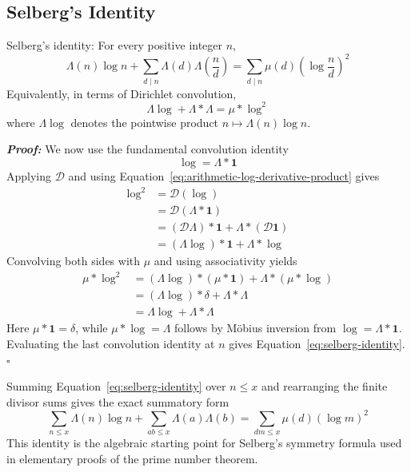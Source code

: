 \documentclass[a4paper,11pt,abstracton]{scrartcl}
\theoremstyle{dotlessP}
\theoremstyle{dotlessS}
\theoremstyle{remark}
\theoremstyle{definition}
\begin{document}
\subsection{Selberg's Identity}
\label{subsec:selberg-identity}

\begin{mainbox}{Selberg's identity:}
For every positive integer $n$,
\begin{equation}
\label{eq:selberg-identity}
    \Lambda(n)\log n
      +\sum_{d\mid n}\Lambda(d)\Lambda\!\left(\frac nd\right)
      =\sum_{d\mid n}\mu(d)
        \left(\log\frac nd\right)^2
\end{equation}
Equivalently, in terms of Dirichlet convolution,
\[
    \Lambda\log+\Lambda*\Lambda=\mu*\log^2
\]
where $\Lambda\log$ denotes the pointwise product
$n\mapsto\Lambda(n)\log n$.
\end{mainbox}

\begin{claim_box}
\textbf{\textit{Proof:}}
We now use the fundamental convolution identity
\[
    \log=\Lambda*\mathbf{1}
\]
Applying $\mathcal{D}$ and using
Equation~\eqref{eq:arithmetic-log-derivative-product} gives
\begin{align*}
    \log^2
      &=\mathcal{D}(\log)\\
      &=\mathcal{D}(\Lambda*\mathbf{1})\\
      &=(\mathcal{D}\Lambda)*\mathbf{1}
        +\Lambda*(\mathcal{D}\mathbf{1})\\
      &=(\Lambda\log)*\mathbf{1}+\Lambda*\log
\end{align*}
Convolving both sides with $\mu$ and using associativity yields
\begin{align*}
    \mu*\log^2
      &=(\Lambda\log)*(\mu*\mathbf{1})
        +\Lambda*(\mu*\log)\\
      &=(\Lambda\log)*\delta+\Lambda*\Lambda\\
      &=\Lambda\log+\Lambda*\Lambda
\end{align*}
Here $\mu*\mathbf{1}=\delta$, while
$\mu*\log=\Lambda$ follows by Möbius inversion from
$\log=\Lambda*\mathbf{1}$. Evaluating the last convolution identity at
$n$ gives Equation~\eqref{eq:selberg-identity}.
\hfill$\square$
\end{claim_box}

\begin{remark_box}
Summing Equation~\eqref{eq:selberg-identity} over $n\leq x$ and
rearranging the finite divisor sums gives the exact summatory form
\begin{equation}
\label{eq:selberg-identity-summed}
    \sum_{n\leq x}\Lambda(n)\log n
      +\sum_{ab\leq x}\Lambda(a)\Lambda(b)
      =\sum_{dm\leq x}\mu(d)(\log m)^2
\end{equation}
This identity is the algebraic starting point for Selberg's symmetry
formula used in elementary proofs of the prime number theorem.
\end{remark_box}
\end{document}
